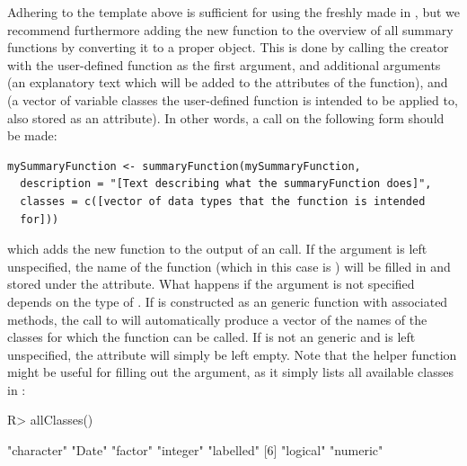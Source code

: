 \documentclass[article,shortnames]{jss}
\newcommand{\hl}[1]{\textcolor{magenta}{#1}}
\begin{document}
Adhering to the template above is sufficient for using the freshly
made  in , but we recommend
furthermore adding the new function to the overview of all summary
functions by converting it to a proper 
object. This is done by calling the  creator with
the user-defined function as the first argument, and additional arguments
 (an explanatory text which will be added to the attributes of
the function), and  (a vector of variable classes the
user-defined function is intended to be applied to, also stored as an
attribute). In other words, a call on the following form should be made:
\begin{Verbatim}
mySummaryFunction <- summaryFunction(mySummaryFunction,
  description = "[Text describing what the summaryFunction does]",
  classes = c([vector of data types that the function is intended
  for]))
\end{Verbatim}
which adds the new function to the output of an
 call.
If the  argument is left unspecified, the name of the
function (which in this case is ) will be filled in and
stored under the  attribute. What happens if the  argument is
not specified depends on the type of . If
 is constructed as an  generic function with associated
methods, the call to  will automatically produce
a vector of the names of the classes for which the function can be
called. If  is not an  generic and
 is left unspecified, the attribute will simply be
left empty. Note that the helper function  might be useful
for filling out the  argument, as it simply lists all
available classes in :

\begin{Schunk}
\begin{Sinput}
R> allClasses()
\end{Sinput}
\begin{Soutput}
[1] "character" "Date"      "factor"    "integer"   "labelled" 
[6] "logical"   "numeric"  
\end{Soutput}
\end{Schunk}

\end{document}
